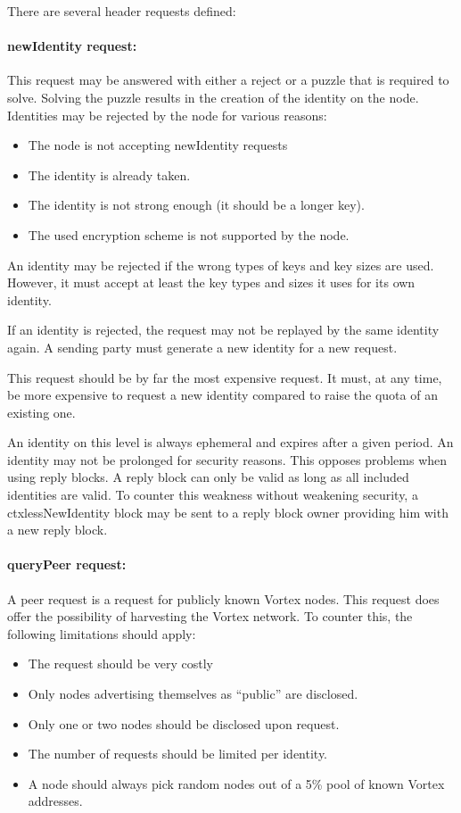 There are several header requests defined:

\paragraph{newIdentity request:} This request may be answered with either a reject or a puzzle that is required to solve. Solving the puzzle results in the creation of the identity on the node. Identities may be rejected by the node for various reasons:

\begin{itemize}
	\item The node is not accepting newIdentity requests
	\item The identity is already taken.
	\item The identity is not strong enough (it should be a longer key).
	\item The used encryption scheme is not supported by the node.
\end{itemize}

An identity may be rejected if the wrong types of keys and key sizes are used. However, it must accept at least the key types and sizes it uses for its own identity.

If an identity is rejected, the request may not be replayed by the same identity again. A sending party must generate a new identity for a new request. 

This request should be by far the most expensive request. It must, at any time, be more expensive to request a new identity compared to raise the quota of an existing one.

An identity on this level is always ephemeral and expires after a given period. An identity may not be prolonged for security reasons. This opposes problems when using reply blocks. A reply block can only be valid as long as all included identities are valid. To counter this weakness without weakening security, a ctxlessNewIdentity block may be sent to a reply block owner providing him with a new reply block.

\paragraph{queryPeer request:} A peer request is a request for publicly known Vortex nodes. This request does offer the possibility of harvesting the Vortex network. To counter this, the following limitations should apply:
\begin{itemize}
	\item The request should be very costly
	\item Only nodes advertising themselves as ``public'' are disclosed.
	\item Only one or two nodes should be disclosed upon request.
	\item The number of requests should be limited per identity.
	\item A node should always pick random nodes out of a 5\% pool of known Vortex addresses.
\end{itemize}

